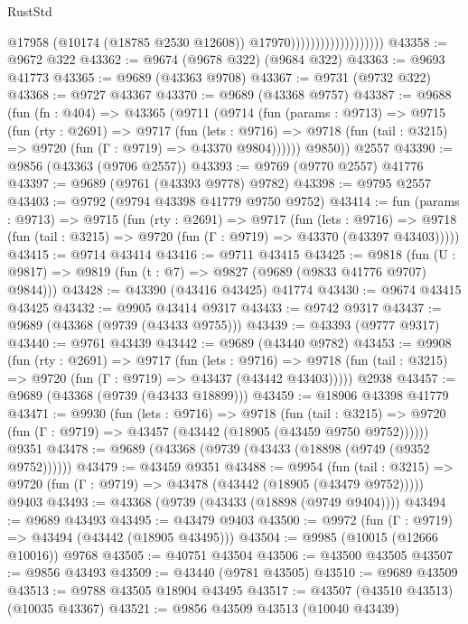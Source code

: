 \begin{lexlean}{RustStd}
\begin{coremodule}
                                          @17958
                                          (@10174 (@18785 @2530 @12608))
                                          @17970)))))))))))))))))))
@43358 := @9672 @322
@43362 := @9674 (@9678 @322) (@9684 @322)
@43363 := @9693 @41773
@43365 := @9689 (@43363 @9708)
@43367 := @9731 (@9732 @322)
@43368 := @9727 @43367
@43370 := @9689 (@43368 @9757)
@43387 := @9688
    (fun (fn : @404) =>
    @43365
      (@9711
        (@9714
          (fun (params : @9713) =>
          @9715
            (fun (rty : @2691) =>
            @9717
              (fun (lets : @9716) =>
              @9718 (fun (tail : @3215) => @9720 (fun (Γ : @9719) => @43370 @9804))))))
        @9850))
    @2557
@43390 := @9856 (@43363 (@9706 @2557))
@43393 := @9769 (@9770 @2557) @41776
@43397 := @9689 (@9761 (@43393 @9778) @9782)
@43398 := @9795 @2557
@43403 := @9792 (@9794 @43398 @41779 @9750 @9752)
@43414 := fun (params : @9713) =>
  @9715
    (fun (rty : @2691) =>
    @9717
      (fun (lets : @9716) =>
      @9718 (fun (tail : @3215) => @9720 (fun (Γ : @9719) => @43370 (@43397 @43403)))))
@43415 := @9714 @43414
@43416 := @9711 @43415
@43425 := @9818
    (fun (U : @9817) => @9819 (fun (t : @7) => @9827 (@9689 (@9833 @41776 @9707) @9844)))
@43428 := @43390 (@43416 @43425) @41774
@43430 := @9674 @43415 @43425
@43432 := @9905 @43414 @9317
@43433 := @9742 @9317
@43437 := @9689 (@43368 (@9739 (@43433 @9755)))
@43439 := @43393 (@9777 @9317)
@43440 := @9761 @43439
@43442 := @9689 (@43440 @9782)
@43453 := @9908
    (fun (rty : @2691) =>
    @9717
      (fun (lets : @9716) =>
      @9718 (fun (tail : @3215) => @9720 (fun (Γ : @9719) => @43437 (@43442 @43403)))))
    @2938
@43457 := @9689 (@43368 (@9739 (@43433 @18899)))
@43459 := @18906 @43398 @41779
@43471 := @9930
    (fun (lets : @9716) =>
    @9718
      (fun (tail : @3215) =>
      @9720 (fun (Γ : @9719) => @43457 (@43442 (@18905 (@43459 @9750 @9752))))))
    @9351
@43478 := @9689 (@43368 (@9739 (@43433 (@18898 (@9749 (@9352 @9752))))))
@43479 := @43459 @9351
@43488 := @9954
    (fun (tail : @3215) => @9720 (fun (Γ : @9719) => @43478 (@43442 (@18905 (@43479 @9752)))))
    @9403
@43493 := @43368 (@9739 (@43433 (@18898 (@9749 @9404))))
@43494 := @9689 @43493
@43495 := @43479 @9403
@43500 := @9972 (fun (Γ : @9719) => @43494 (@43442 (@18905 @43495)))
@43504 := @9985 (@10015 (@12666 @10016)) @9768
@43505 := @40751 @43504
@43506 := @43500 @43505
@43507 := @9856 @43493
@43509 := @43440 (@9781 @43505)
@43510 := @9689 @43509
@43513 := @9788 @43505 @18904 @43495
@43517 := @43507 (@43510 @43513) (@10035 @43367)
@43521 := @9856 @43509 @43513 (@10040 @43439)

\end{coremodule}
\end{lexlean}
